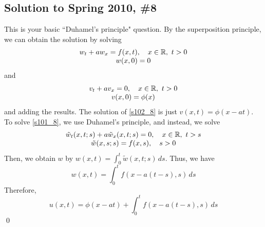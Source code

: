 \subsection*{Solution to Spring 2010, \#8}\label{s108}
This is your basic ``Duhamel's principle" question. By the superposition principle, we can obtain the solution by solving
\begin{equation}
	\label{s101_8}
	\begin{array}{c}
	w_t + aw_x = f(x,t), \quad x \in \mathbb{R}, \,\, t > 0 \\
	w(x,0) = 0
	\end{array}
\end{equation}
and
\begin{equation}
	\label{s102_8}
	\begin{array}{c}
	v_t + av_x = 0, \quad x \in \mathbb{R}, \,\, t>0 \\
	v(x,0) = \phi(x)
	\end{array}
\end{equation}
and adding the results. The solution of \eqref{s102_8} is just $v(x,t) = \phi(x-at)$. To solve \eqref{s101_8}, we use Duhamel's principle, and instead, we solve
\begin{equation}
	\label{s103_8}
	\begin{array}{c}
	\tilde w_t(x,t;s) + a \tilde w_x(x,t;s) = 0, \quad x \in \mathbb{R}, \,\, t > s \\
	\tilde w(x,s;s) = f(x,s), \quad s>0
	\end{array}
\end{equation}
Then, we obtain $w$ by $w(x,t) = \int_0^t \tilde w(x,t;s) \, ds$. Thus, we have
$$ w(x,t) = \int_0^t f(x-a(t-s),s) \, ds $$
Therefore,
$$ u(x,t) = \phi(x-at) + \int_0^t f(x-a(t-s),s) \, ds $$ \hfill\qed
